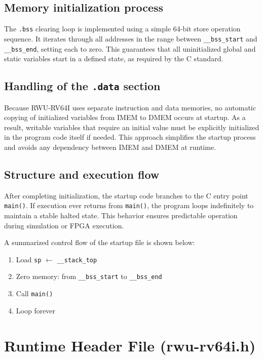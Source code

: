 \subsection*{Memory initialization process}

The \texttt{.bss} clearing loop is implemented using a simple 64-bit store operation sequence.  
It iterates through all addresses in the range between \texttt{\_\_bss\_start} and \texttt{\_\_bss\_end}, setting each to zero.  
This guarantees that all uninitialized global and static variables start in a defined state, as required by the C standard.

\subsection*{Handling of the \texttt{.data} section}

Because RWU-RV64I uses separate instruction and data memories, no automatic copying of initialized variables from IMEM to DMEM occurs at startup.  
As a result, writable variables that require an initial value must be explicitly initialized in the program code itself if needed.  
This approach simplifies the startup process and avoids any dependency between IMEM and DMEM at runtime.

\subsection*{Structure and execution flow}

After completing initialization, the startup code branches to the C entry point \texttt{main()}.  
If execution ever returns from \texttt{main()}, the program loops indefinitely to maintain a stable halted state.  
This behavior ensures predictable operation during simulation or FPGA execution.

A summarized control flow of the startup file is shown below:

\begin{enumerate}
  \item Load \texttt{sp} $\leftarrow$ \texttt{\_\_stack\_top}
  \item Zero memory: from \texttt{\_\_bss\_start} to \texttt{\_\_bss\_end}
  \item Call \texttt{main()}
  \item Loop forever
\end{enumerate}


\section{Runtime Header File (rwu-rv64i.h)}
\label{sec:runtime_header}

